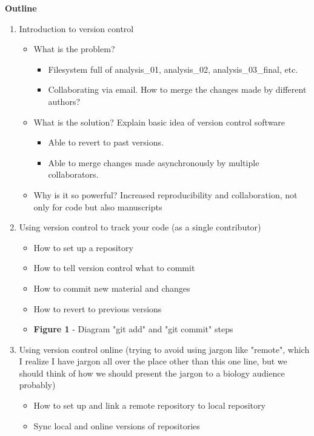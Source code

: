 \textbf{Outline}

\begin{enumerate}
  \item Introduction to version control
  \begin{itemize}
    \item What is the problem?
    \begin{itemize}
      \item Filesystem full of analysis\_01, analysis\_02, analysis\_03\_final, etc.
      \item Collaborating via email. How to merge the changes made by different authors?
    \end{itemize}
    \item What is the solution? Explain basic idea of version control software
    \begin{itemize}
      \item Able to revert to past versions.
      \item Able to merge changes made asynchronously by multiple collaborators.
    \end{itemize}
    \item Why is it so powerful? Increased reproducibility and collaboration, not only for code but also manuscripts \cite{23448176}
\end{itemize}
  \item Using version control to track your code (as a single contributor)
  \begin{itemize}
    \item How to set up a repository
    \item How to tell version control what to commit
    \item How to commit new material and changes
    \item How to revert to previous versions
    \item \textbf{Figure 1} - Diagram "git add" and "git commit" steps
  \end{itemize}
  \item Using version control online (trying to avoid using jargon like "remote", which I realize I have jargon all over the place other than this one line, but we should think of how we should present the jargon to a biology audience probably)
  \begin{itemize}
    \item How to set up and link a remote repository to local repository
    \item Sync local and online versions of repositories

\end{itemize}
\end{enumerate}
